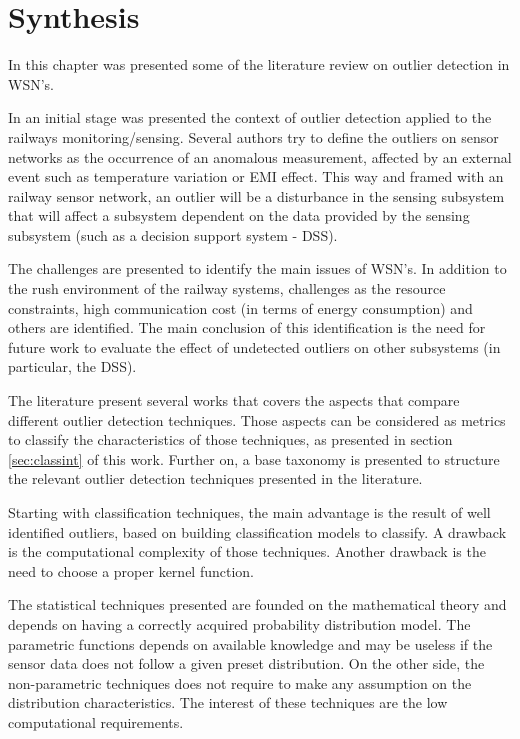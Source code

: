 \newpage
\section{Synthesis}
\label{sec:synth}


In this chapter was presented some of the literature review on outlier detection in WSN's.

In an initial stage was presented the context of outlier detection applied to the railways monitoring/sensing.
Several authors try to define the outliers on sensor networks as the occurrence of an anomalous measurement, affected by an external event such as temperature variation or EMI effect.
This way and framed with an railway sensor network, an outlier will be a disturbance in the sensing subsystem that will affect a subsystem dependent on the data provided by the sensing subsystem (such as a decision support system - DSS).

The challenges are presented to identify the main issues of WSN's. In addition to the rush environment of the railway systems, challenges as the resource constraints, high communication cost (in terms of energy consumption) and others are identified. The main conclusion of this identification is the need for future work to evaluate the effect of undetected outliers on other subsystems (in particular, the DSS).

The literature present several works that covers the aspects that compare different outlier detection techniques. Those aspects can be considered as metrics to classify the characteristics of those techniques, as presented in section \ref{sec:classint} of this work. Further on, a base taxonomy is presented to structure the relevant outlier detection techniques presented in the literature.

Starting with classification techniques, the main advantage is the result of well identified outliers, based on building classification models to classify. A drawback is the computational complexity of those techniques. Another drawback is the need to choose a proper kernel function.

The statistical techniques presented are founded on the mathematical theory and depends on having a correctly acquired probability distribution model. The parametric functions depends on available knowledge and may be useless if the sensor data does not follow a given preset distribution.  On the other side, the non-parametric techniques does not require to make any assumption on the distribution characteristics. The interest of these techniques are the low computational requirements.


